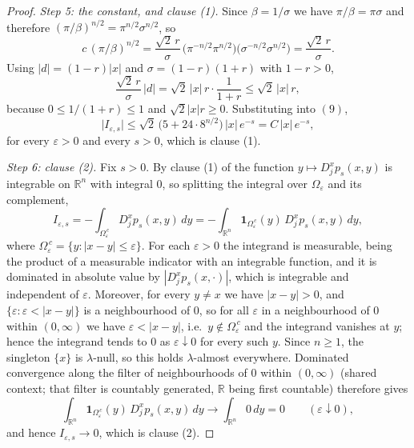 \begin{proof}
\emph{Step 5: the constant, and clause (1).}
Since $\beta = 1/\sigma$ we have $\pi/\beta = \pi\sigma$ and therefore
$(\pi/\beta)^{n/2} = \pi^{n/2}\sigma^{n/2}$, so
\[
  c\,(\pi/\beta)^{n/2}
    = \frac{\sqrt2\,r}{\sigma}\,
      \bigl(\pi^{-n/2}\pi^{n/2}\bigr)\bigl(\sigma^{-n/2}\sigma^{n/2}\bigr)
    = \frac{\sqrt2\,r}{\sigma} .
\]
Using $|d| = (1-r)|x|$ and $\sigma = (1-r)(1+r)$ with $1-r > 0$,
\[
  \frac{\sqrt2\,r}{\sigma}\,|d|
    = \sqrt2\,|x|\,r\cdot\frac{1}{1+r}
    \leq \sqrt2\,|x|\,r ,
\]
because $0 \leq 1/(1+r) \leq 1$ and $\sqrt2|x|r \geq 0$.  Substituting into
$(9)$,
\[
  \bigl|I_{\varepsilon,s}\bigr|
    \leq \sqrt2\,\bigl(5+24\cdot8^{n/2}\bigr)\,|x|\,e^{-s} = C\,|x|\,e^{-s} ,
\]
for every $\varepsilon > 0$ and every $s > 0$, which is clause (1).

\emph{Step 6: clause (2).}
Fix $s > 0$.  By clause (1) of  the function
$y \mapsto D_j^xp_s(x,y)$ is integrable on $\mathbb{R}^n$ with integral $0$, so
splitting the integral over $\Omega_\varepsilon$ and its complement,
\[
  I_{\varepsilon,s}
    = -\int_{\Omega_\varepsilon^{\,c}} D_j^xp_s(x,y)\,dy
    = -\int_{\mathbb{R}^n}
        \mathbf 1_{\Omega_\varepsilon^{\,c}}(y)\,D_j^xp_s(x,y)\,dy ,
\]
where $\Omega_\varepsilon^{\,c} = \{y : |x-y| \leq \varepsilon\}$.  For each
$\varepsilon > 0$ the integrand is measurable, being the product of a
measurable indicator with an integrable function, and it is dominated in
absolute value by $|D_j^xp_s(x,\cdot)|$, which is integrable and independent of
$\varepsilon$.  Moreover, for every $y \neq x$ we have $|x-y| > 0$, and
$\{\varepsilon : \varepsilon < |x-y|\}$ is a neighbourhood of $0$, so for all
$\varepsilon$ in a neighbourhood of $0$ within $(0,\infty)$ we have
$\varepsilon < |x-y|$, i.e.\ $y \notin \Omega_\varepsilon^{\,c}$ and the
integrand vanishes at $y$; hence the integrand tends to $0$ as
$\varepsilon \downarrow 0$ for every such $y$.  Since $n \geq 1$, the singleton
$\{x\}$ is $\lambda$-null, so this holds $\lambda$-almost everywhere.  Dominated
convergence along the filter of neighbourhoods of $0$ within $(0,\infty)$
(shared context; that filter is countably generated, $\mathbb{R}$ being
first countable) therefore gives
\[
  \int_{\mathbb{R}^n}
      \mathbf 1_{\Omega_\varepsilon^{\,c}}(y)\,D_j^xp_s(x,y)\,dy
    \longrightarrow \int_{\mathbb{R}^n} 0\,dy = 0
  \qquad (\varepsilon\downarrow0) ,
\]
and hence $I_{\varepsilon,s} \to 0$, which is clause (2).
\end{proof}
